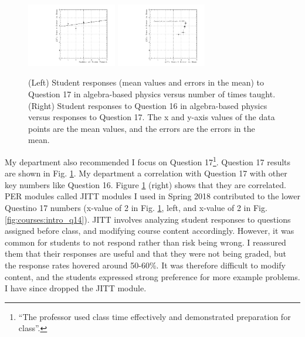 \documentclass[../../main.tex]{subfiles}
\begin{document}
\begin{figure}[h]
\centering
\includegraphics[width=0.35\textwidth]{Q17_algebra_based.pdf}
\includegraphics[width=0.35\textwidth]{Q16_Q17_algebra_based.pdf}
\caption{\label{fig:courses:intro_q17}  (Left) Student responses (mean values and errors in the mean) to Question 17 in algebra-based physics versus number of times taught. (Right) Student responses to Question 16 in algebra-based physics versus responses to Question 17.  The x and y-axis values of the data points are the mean values, and the errors are the errors in the mean.}
\end{figure}

My department also recommended I focus on Question 17\footnote{``The professor used class time effectively and demonstrated preparation for class''.}.  Question 17 results are shown in Fig. \ref{fig:courses:intro_q17}.  My department a correlation with Question 17 with other key numbers like Question 16.  Figure \ref{fig:courses:intro_q17} (right) shows that they are correlated.  PER modules called JITT modules I used in Spring 2018 contributed to the lower Questino 17 numbers (x-value of 2 in Fig. \ref{fig:courses:intro_q17}, left, and x-value of 2 in Fig. \ref{fig:courses:intro_q14}).  JITT involves analyzing student responses to questions assigned before class, and modifying course content accordingly.  However, it was common for students to not respond rather than risk being wrong.  I reassured them that their responses are useful and that they were not being graded, but the response rates hovered around 50-60\%.  It was therefore difficult to modify content, and the students expressed strong preference for more example problems.  I have since dropped the JITT module.  \\ \hspace{0.1cm}
\end{document}
